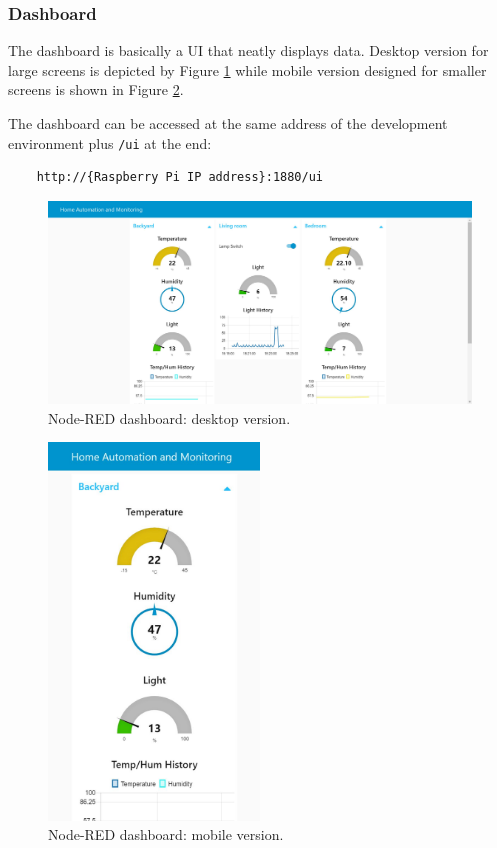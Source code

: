 \subsubsection{Dashboard}
The dashboard is basically a UI that neatly displays data. Desktop version for large screens is depicted by Figure \ref{desktop_ui} while mobile version designed for smaller screens is shown in Figure \ref{mobile_ui}.

The dashboard can be accessed at the same address of the development environment plus \texttt{/ui} at the end:

\begin{verbatim}
    http://{Raspberry Pi IP address}:1880/ui
\end{verbatim}

\begin{figure}[H]
	\begin{center}
		\includegraphics[width=1.0\textwidth]{./pictures/laptop_dashboard.JPG}
		\caption{Node-RED dashboard: desktop version.}
		\label{desktop_ui}
	\end{center}
\end{figure}

\begin{figure}[H]
	\begin{center}
		\includegraphics[width=0.5\textwidth]{./pictures/smartphone_dashboard.JPG}
		\caption{Node-RED dashboard: mobile version.}
		\label{mobile_ui}
	\end{center}
\end{figure}

